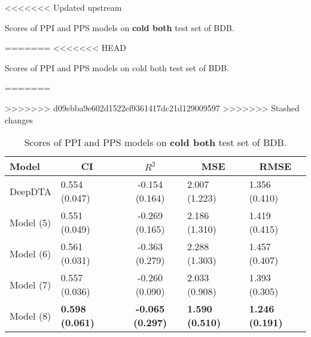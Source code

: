 \begin{table}
\centering
<<<<<<< Updated upstream
\caption{Scores of PPI and PPS models on \textbf{cold both} test set of BDB.}
\label{tab:ddi_ci_r2}
=======
<<<<<<< HEAD
\caption{Scores of PPI and PPS models on cold both test set of BDB.}
\vspace{.25em}
=======
\caption{Scores of PPI and PPS models on \textbf{cold both} test set of BDB.}
\label{tab:ddi_ci_r2}
>>>>>>> d09ebba9e602d1522ef9361417dc21d129009597
>>>>>>> Stashed changes
\begin{tabular}{|l|l|c|l|l|} 
\hline
Model & \multicolumn{1}{c|}{CI} & $R^2$ & \multicolumn{1}{c|}{MSE} & \multicolumn{1}{c|}{RMSE} \\ 
\hline
DeepDTA & 0.554 (0.047) & -0.154 (0.164) & 2.007 (1.223) & 1.356 (0.410) \\ 
\hline
Model (5) & 0.551 (0.049) & -0.269 (0.165) & 2.186 (1.310) & 1.419 (0.415) \\ 
\hline
Model (6) & 0.561 (0.031) & -0.363 (0.279) & 2.288 (1.303) & 1.457 (0.407) \\ 
\hline
Model (7) & 0.557 (0.036) & -0.260 (0.090) & 2.033 (0.908) & 1.393 (0.305) \\ 
\hline
Model (8) & \textbf{0.598 (0.061)} & \textbf{-0.065 (0.297)} & \textbf{1.590 (0.510)} & \textbf{1.246 (0.191)} \\
\hline
\end{tabular}
\label{tab:ppi_vs_pps_cold_both}
\end{table}